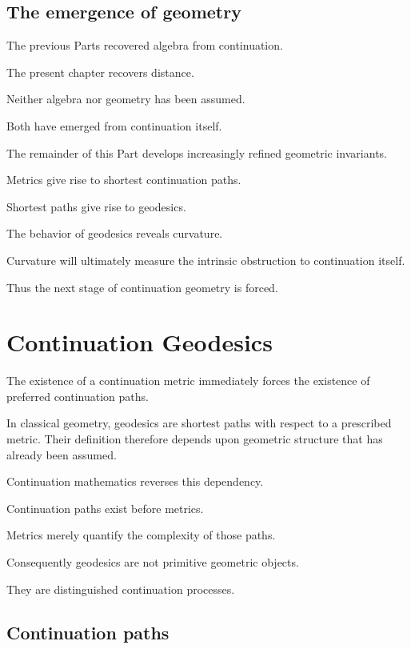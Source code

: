 \documentclass[13pt,openany]{book}
\theoremstyle{plain}
\theoremstyle{definition}
\begin{document}

\section{The emergence of geometry}

The previous Parts recovered algebra from continuation.

The present chapter recovers distance.

Neither algebra nor geometry has been assumed.

Both have emerged from continuation itself.

The remainder of this Part develops increasingly refined geometric invariants.

Metrics give rise to shortest continuation paths.

Shortest paths give rise to geodesics.

The behavior of geodesics reveals curvature.

Curvature will ultimately measure the intrinsic obstruction to continuation itself.

Thus the next stage of continuation geometry is forced.

\chapter{Continuation Geodesics}

The existence of a continuation metric immediately forces the existence of preferred continuation paths.

In classical geometry, geodesics are shortest paths with respect to a prescribed metric. Their definition therefore depends upon geometric structure that has already been assumed.

Continuation mathematics reverses this dependency.

Continuation paths exist before metrics.

Metrics merely quantify the complexity of those paths.

Consequently geodesics are not primitive geometric objects.

They are distinguished continuation processes.


\section{Continuation paths}
\end{document}
